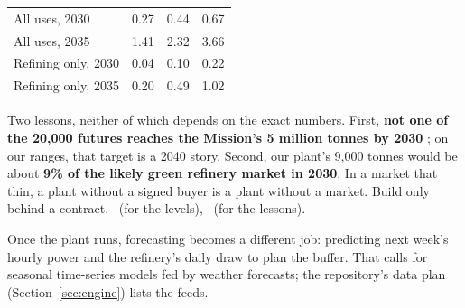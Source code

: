 \begin{center}\tablefont
\begin{tabularx}{\textwidth}{@{}L c c c@{}}
\toprule
{} &  &  & \\ \midrule
All uses, 2030 & 0.27 & 0.44 & 0.67\\
All uses, 2035 & 1.41 & 2.32 & 3.66\\
Refining only, 2030 & 0.04 & 0.10 & 0.22\\
Refining only, 2035 & 0.20 & 0.49 & 1.02\\
\bottomrule
\end{tabularx}
\end{center}

\begin{finding}
Two lessons, neither of which depends on the exact numbers. First, \textbf{not one of the 20,000 futures reaches the Mission's 5 million tonnes by 2030} \cite{govnow2023}; on our ranges, that target is a 2040 story. Second, our plant's 9,000 tonnes would be about \textbf{9\% of the likely green refinery market in 2030}. In a market that thin, a plant without a signed buyer is a plant without a market. Build only behind a contract. \confL\ (for the levels), \confM\ (for the lessons).
\end{finding}

\noindent Once the plant runs, forecasting becomes a different job: predicting next week's hourly power and the refinery's daily draw to plan the buffer. That calls for seasonal time-series models fed by weather forecasts; the repository's data plan (Section~\ref{sec:engine}) lists the feeds.
\newpage
